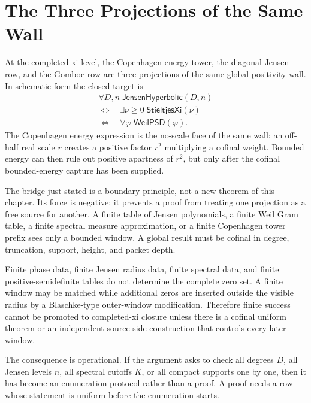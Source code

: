 \section{The Three Projections of the Same Wall}
\label{sec:rh-copenhagen-three-projections}

\begin{principle}
\label{prin:rh-copenhagen-boundary}
At the completed-xi level, the Copenhagen energy tower, the
diagonal-Jensen row, and the Gomboc row are three projections of the same
global positivity wall.  In schematic form the closed target is
$$
\begin{gathered}
\forall D,n\; \mathsf{JensenHyperbolic}(D,n)\\
\Longleftrightarrow\quad
\exists \nu\ge0\; \mathsf{StieltjesXi}(\nu)\\
\Longleftrightarrow\quad
\forall \varphi\; \mathsf{WeilPSD}(\varphi).
\end{gathered}
$$
The Copenhagen energy expression is the no-scale face of the same wall:
an off-half real scale $r$ creates a positive factor $r^2$ multiplying a
cofinal weight.  Bounded energy can then rule out positive apartness of
$r^2$, but only after the cofinal bounded-energy capture has been supplied.
\end{principle}

The bridge just stated is a boundary principle, not a new theorem of this
chapter.  Its force is negative: it prevents a proof from treating one
projection as a free source for another.  A finite table of Jensen
polynomials, a finite Weil Gram table, a finite spectral measure
approximation, or a finite Copenhagen tower prefix sees only a bounded
window.  A global result must be cofinal in degree, truncation, support,
height, and packet depth.

\begin{principle}
\label{prin:rh-finite-visibility-incomplete}
Finite phase data, finite Jensen radius data, finite spectral data, and
finite positive-semidefinite tables do not determine the complete zero
set.  A finite window may be matched while additional zeros are inserted
outside the visible radius by a Blaschke-type outer-window modification.
Therefore finite success cannot be promoted to completed-xi closure unless
there is a cofinal uniform theorem or an independent source-side
construction that controls every later window.
\end{principle}

The consequence is operational.  If the argument asks to check all
degrees $D$, all Jensen levels $n$, all spectral cutoffs $K$, or all
compact supports one by one, then it has become an enumeration protocol
rather than a proof.  A proof needs a row whose statement is uniform
before the enumeration starts.

